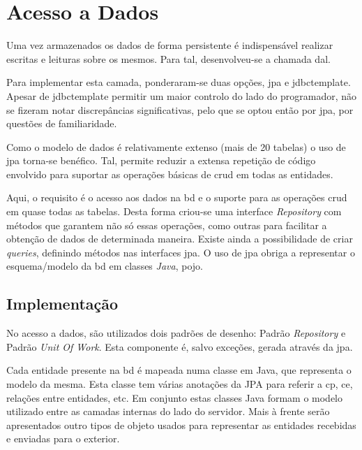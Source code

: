 %
%
\section{Acesso a Dados}\label{sec33}

Uma vez armazenados os dados de forma persistente é indispensável realizar escritas e leituras sobre os mesmos. Para tal, desenvolveu-se a chamada \acrfull{dal}. 

Para implementar esta camada, ponderaram-se duas opções, \gls{jpa} e \gls{jdbctemplate}. Apesar de \acrshort{jdbctemplate} permitir um maior controlo do lado do programador, não se fizeram notar discrepâncias significativas, pelo que se optou então por \acrshort{jpa}, por questões de familiaridade.

Como o modelo de dados é relativamente extenso (mais de 20 tabelas) o uso de \acrshort{jpa} torna-se benéfico. Tal, permite reduzir a extensa repetição de código envolvido para suportar as operações básicas de \acrfull{crud} em todas as entidades. 

Aqui, o requisito é o acesso aos dados na \acrshort{bd} e o suporte para as operações \acrshort{crud} em quase todas as tabelas. Desta forma criou-se uma interface \textit{Repository} com métodos que garantem não só essas operações, como outras para facilitar a obtenção de dados de determinada maneira. Existe ainda a possibilidade de criar \textit{queries}, definindo métodos nas interfaces \acrshort{jpa}. O uso de \acrshort{jpa} obriga a representar o esquema/modelo da \acrshort{bd} em classes \textit{Java}, \acrfull{pojo}.

 \subsection{Implementação}\label{subsec331}
 
 No acesso a dados, são utilizados dois padrões de desenho: Padrão \textit{Repository} e Padrão \textit{Unit Of Work}. Esta componente é, salvo exceções, gerada através da \acrshort{jpa}.
 
 Cada entidade presente na \acrshort{bd} é mapeada numa classe em Java, que representa o modelo da mesma. Esta classe tem várias anotações da JPA para referir a \acrlong{cp}, \acrlong{ce}, relações entre entidades, etc. Em conjunto estas classes Java formam o modelo utilizado entre as camadas internas do lado do servidor. Mais à frente serão apresentados outro tipos de objeto usados para representar as entidades recebidas e enviadas para o exterior.
 
 
